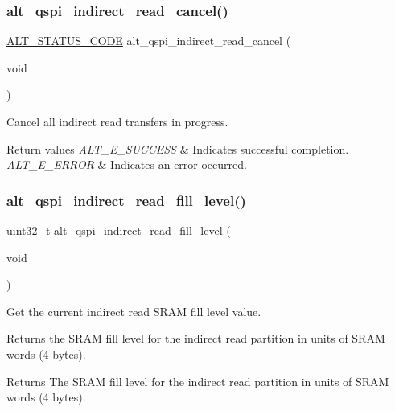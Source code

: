 \subsubsection{\texorpdfstring{alt\_qspi\_indirect\_read\_cancel()}{alt\_qspi\_indirect\_read\_cancel()}}
{\footnotesize\ttfamily \mbox{\hyperlink{hwlib_8h_abdb0d369f069723ca55d6c94bcaaaa12}{A\+L\+T\+\_\+\+S\+T\+A\+T\+U\+S\+\_\+\+C\+O\+DE}} alt\+\_\+qspi\+\_\+indirect\+\_\+read\+\_\+cancel (\begin{DoxyParamCaption}\item[{void}]{ }\end{DoxyParamCaption})}

Cancel all indirect read transfers in progress.


\begin{DoxyRetVals}{Return values}
{\em A\+L\+T\+\_\+\+E\+\_\+\+S\+U\+C\+C\+E\+SS} & Indicates successful completion. \\
\hline
{\em A\+L\+T\+\_\+\+E\+\_\+\+E\+R\+R\+OR} & Indicates an error occurred. \\
\hline
\end{DoxyRetVals}
\mbox{\label{group__ALT__QSPI__INDAC_gae7452ee77a72a893dbce80439107d0e2}} 
\subsubsection{\texorpdfstring{alt\_qspi\_indirect\_read\_fill\_level()}{alt\_qspi\_indirect\_read\_fill\_level()}}
{\footnotesize\ttfamily uint32\+\_\+t alt\+\_\+qspi\+\_\+indirect\+\_\+read\+\_\+fill\+\_\+level (\begin{DoxyParamCaption}\item[{void}]{ }\end{DoxyParamCaption})}

Get the current indirect read S\+R\+AM fill level value.

Returns the S\+R\+AM fill level for the indirect read partition in units of S\+R\+AM words (4 bytes).

\begin{DoxyReturn}{Returns}
The S\+R\+AM fill level for the indirect read partition in units of S\+R\+AM words (4 bytes). 
\end{DoxyReturn}
\mbox{\label{group__ALT__QSPI__INDAC_gaa36b9eb2736eaaaecaf718b164857c7e}} 
